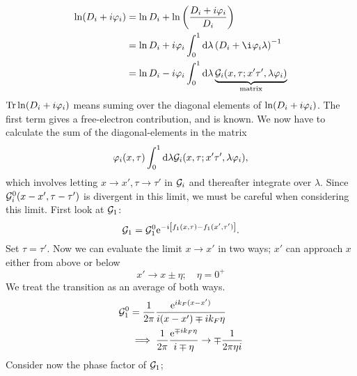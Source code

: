 \begin{align*}
\ln(D_i + i\p_i) &= \ln D_i + \ln\left(\frac{D_i+i\p_i}{D_i}\right) \\
&=\ln D_i +i\p_i\int_0^1\dd\lambda\left(D_i+\i\p_i\lambda\right)^{-1} \\
&=\ln D_i - i\p_i\int_0^1\dd\lambda\underbrace{\gre_i(x,\tau;x'\tau',\lambda\p_i)}_{\text{matrix}}
\end{align*}
$\Tr\ln(D_i+i\varphi_i)$ means suming over the diagonal elements of $\ln(D_i+i\varphi_i)$. The first term gives a free-electron contribution, and is known. 
We now have to calculate the sum of the diagonal-elements in the matrix
\begin{equation}
	\varphi_i(x,\tau)\int_{0}^{1}\dd\lambda\mathcal{G}_i(x,\tau;x'\tau',\lambda\varphi_i),
\end{equation}
which involves letting $x\rightarrow x', \tau\rightarrow\tau'$ in $\mathcal{G}_i$ and thereafter integrate over $\lambda$.
Since $\mathcal{G}_i^0(x-x',\tau-\tau')$ is divergent in this limit, we must be careful when considering this limit. First look at $\mathcal{G}_1$:
\begin{equation}
\mathcal{G}_1 = \mathcal{G}_1^0\mathrm{e}^{-i\left[f_1(x,\tau)-f_1(x',\tau')\right]}.
\end{equation}
Set $\tau =\tau'$. Now we can evaluate the limit $x\rightarrow x'$ in two ways; $x'$ can approach $x$ either from above or below \[x'\rightarrow x\pm\eta;\quad \eta = 0^+\]
We treat the transition as an average of both ways.
\begin{align}
\mathcal{G}_1^0 &= \frac{1}{2\pi}\frac{\mathrm{e}^{ik_F(x-x')}}{i(x-x') \mp ik_F\eta} \\
&\implies \frac{1}{2\pi}\frac{\mathrm{e}^{\mp ik_F\eta}}{i\mp\eta}\rightarrow \mp\frac{1}{2\pi\eta i}
\end{align}
Consider now the phase factor of $\mathcal{G}_1$;


